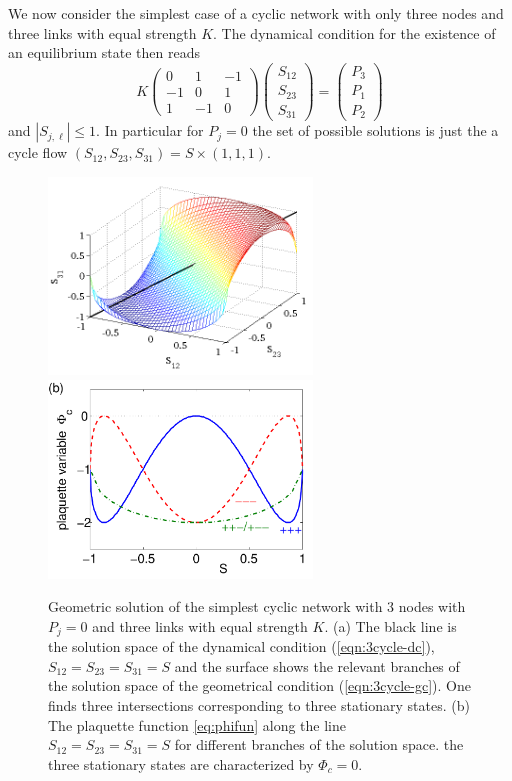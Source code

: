 \documentclass[10pt,aps,pre,preprint,superscriptaddress]{revtex4-1}
\newcommand{\be}{\begin{equation}}
\newcommand{\ee}{\end{equation}}
\begin{document}
We now consider the simplest case of a cyclic network with only 
three nodes and three links with equal strength $K$. The 
dynamical condition for the existence of an equilibrium state then
reads
\be
   K \begin{pmatrix} 0 & 1 & -1 \\ -1 & 0 & 1 \\ 1 & -1 & 0   
   \end{pmatrix}
   \begin{pmatrix} S_{12} \\ S_{23} \\ S_{31} \end{pmatrix}
  = \begin{pmatrix} P_3 \\ P_1 \\ P_2 \end{pmatrix}
    \label{eqn:3cycle-dc} 
\ee
 and $|S_{j,\ell}| \le 1$. In particular for $P_j = 0$ the
set of possible solutions is just the a cycle flow 
$(S_{12}, S_{23}, S_{31}) = S \times (1,1,1)$.

\begin{figure}[tb]
\centering
\includegraphics[width=7cm, angle=0]{pics/cycle3b}
\hspace{5mm}
\includegraphics[width=7cm, angle=0]{pics/cycle3b_phifun}
\caption{\label{fig:cycle3}
Geometric solution of the simplest cyclic network with
3 nodes with $P_j=0$ and three links with equal
strength $K$.
(a) The black line is the solution space of the dynamical condition 
(\ref{eqn:3cycle-dc}), $S_{12} = S_{23} = S_{31} = S$
and the surface shows the relevant branches of the solution 
space of the geometrical condition (\ref{eqn:3cycle-gc}). 
One finds three intersections corresponding to three stationary states.
(b) The plaquette function \eqref{eq:phifun} along the line
$S_{12} = S_{23} = S_{31} = S$ for different branches of the
solution space. the three stationary states are characterized by 
$\Phi_c=0$. 
}
\end{figure}
\end{document}
